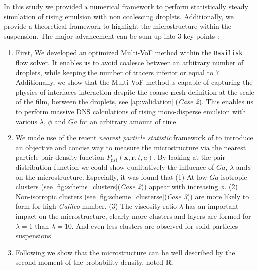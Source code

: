 


In this study we provided a numerical framework to perform statistically steady simulation of rising emulsion with non coalescing droplets. Additionally, we provide a theoretical framework to highlight the microstructure within the suspension.%
The major advancement can be sum up into 3 key points :
\begin{enumerate}
    \item First, We developed an optimized Multi-VoF method within the \texttt{Basilisk} flow solver. 
    It enables us to avoid coalesce between an arbitrary number of droplets, while keeping the number of tracers inferior or equal to $7$. 
    Additionally, we show that the Multi-VoF method is capable of capturing the physics of interfaces interaction despite the coarse mesh definition at the scale of the film, between the droplets, see \ref{ap:validation} (\textit{Case 2}). 
    This enables us to perform massive DNS calculations of rising mono-disperse emulsion with various $\lambda$, $\phi$ and $Ga$ for an arbitrary amount of time.
    \item We made use of the recent \textit{nearest particle statistic} framework of \citet{zhang2023evolution} to introduce an objective and concise way to measure the microstructure via the nearest particle pair density function $P_\text{nst}(\textbf{x},\textbf{r},t,a)$. 
    By looking at the pair distribution function we could show qualitatively the influence of $Ga$, $\lambda$ and$\phi$ on the microstructure.
    Especially, it was found that 
    (1) At low $Ga$ isotropic clusters (see \ref{fig:scheme_clusters}(\textit{Case 2})) appear with increasing $\phi$. 
    (2) Non-isotropic clusters (see \ref{fig:scheme_clusterse}(\textit{Case 3})) are more likely to form for high \textit{Galileo} number.
    (3) The viscosity ratio $\lambda$ has an important impact on the microstructure, clearly more  clusters and layers are formed for $\lambda = 1$ than $\lambda = 10$. 
    And even less clusters are observed for solid particles suspensions. 
    \item Following \citet{zhang2023evolution} we show that the microstructure can be well described by the second moment of the probability density, noted $\textbf{R}$. 

\end{enumerate}
